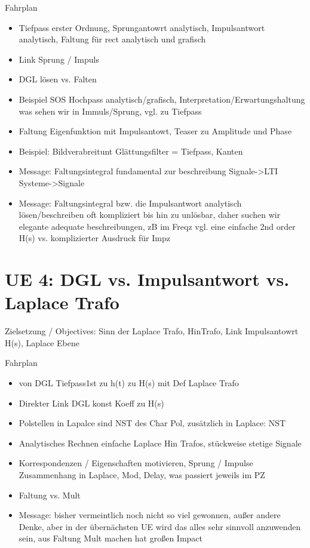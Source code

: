 Fahrplan
\begin{itemize}
\item Tiefpass erster Ordnung, Sprungantowrt analytisch, Impulsantwort analytisch, Faltung für rect analytisch und grafisch
\item Link Sprung / Impuls
\item DGL lösen vs. Falten
\item Beispiel SOS Hochpass analytisch/grafisch, Interpretation/Erwartungshaltung was sehen wir in Immuls/Sprung, vgl. zu Tiefpass
\item Faltung Eigenfunktion mit Impulsantowt, Teaser zu Amplitude und Phase
\item Beispiel: Bildverabreitunt Glättungsfilter = Tiefpass, Kanten
\item Message: Faltungsintegral fundamental zur beschreibung Signale->LTI Systeme->Signale
\item Message: Faltungsintegral bzw. die Impulsantwort analytisch lösen/beschreiben oft kompliziert bis hin zu unlösbar, daher suchen wir elegante adequate beschreibungen, zB im Freqz
vgl. eine einfache 2nd order H(s) vs. komplizierter Ausdruck für Impz
\end{itemize}


\newpage
\section{UE 4: DGL vs. Impulsantwort vs. Laplace Trafo}
Zielsetzung / Objectives: Sinn der Laplace Trafo, HinTrafo, Link Impulsantowrt H(s), Laplace Ebene

Fahrplan
\begin{itemize}
\item von DGL Tiefpass1st zu h(t) zu H(s) mit Def Laplace Trafo
\item Direkter Link DGL konst Koeff zu H(s)
\item Polstellen in Lapalce sind NST des Char Pol, zusätzlich in Laplace: NST
\item Analytisches Rechnen einfache Laplace Hin Trafos, stückweise stetige Signale
\item Korrespondenzen / Eigenschaften motivieren, Sprung / Impulse Zusammenhang in Laplace, Mod, Delay, was passiert jeweils im PZ
\item Faltung vs. Mult
\item Message: bisher vermeintlich noch nicht so viel gewonnen, außer andere Denke, aber in der übernächsten UE wird das alles sehr sinnvoll anzuwenden sein, aus Faltung Mult machen hat  großen Impact
\end{itemize}


